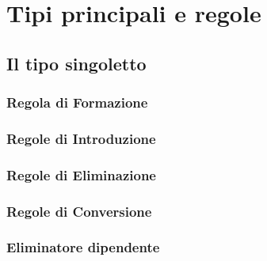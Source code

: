 \appendix
\chapter{Tipi principali e regole}

\section{Il tipo singoletto}
\subsection{Regola di Formazione}
\begin{prooftree}
\end{prooftree}

\subsection{Regole di Introduzione}
\begin{prooftree}
\end{prooftree}

\subsection{Regole di Eliminazione}
\begin{prooftree}
\end{prooftree}
\noindent
\subsection{Regole di Conversione}
\begin{prooftree}
\end{prooftree}
\subsection{Eliminatore dipendente}
\begin{prooftree}
\end{prooftree}

